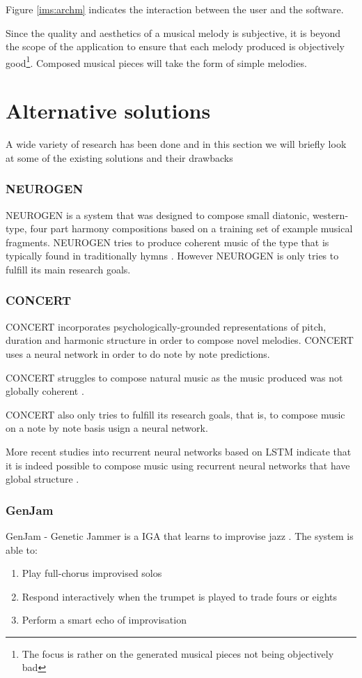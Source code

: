 Figure \ref{ims:archm} indicates the interaction between the user and the software.

Since the quality and aesthetics of a musical melody is subjective, it is beyond the scope of the application to ensure that each melody produced is objectively good\footnote{The focus is rather on the generated musical pieces not being objectively bad}. Composed musical pieces will take the form of simple melodies.

\section{Alternative solutions}
A wide variety of research has been done and in this section we will briefly look at some of the existing solutions and their drawbacks

\subsubsection{NEUROGEN}
NEUROGEN is a system that was designed to compose small diatonic, western-type, four part harmony compositions based on a training set of example musical fragments. NEUROGEN tries to produce coherent music of the type that is typically found in traditionally hymns \cite{gibson1991neurogen}.
However NEUROGEN is only tries to fulfill its main research goals.

\subsubsection{CONCERT}
CONCERT incorporates psychologically-grounded representations of pitch, duration and harmonic structure in order to compose novel melodies. CONCERT uses a neural network in order to do note by note predictions. 

CONCERT struggles to compose natural music as the music produced was not globally coherent \cite{mozer1994neural}. 

CONCERT also only tries to fulfill its research goals, that is, to compose music on a note by note basis usign a neural network.

More recent studies into recurrent neural networks based on \ac{LSTM} indicate that it is indeed possible to compose music using recurrent neural networks that have global structure \cite{Eck2002}.

\subsubsection{GenJam}
GenJam - Genetic Jammer is a \acs{IGA} that learns to improvise jazz \cite{Biles1994}.
The system is able to: 
\begin{enumerate}
\item Play full-chorus improvised solos
\item Respond interactively when the trumpet is played to trade fours or eights
\item Perform a smart echo of improvisation
\end{enumerate}

